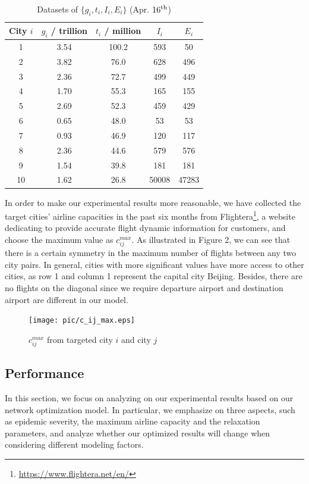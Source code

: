 \documentclass[11pt,twocolumn]{article}
\begin{document}
\begin{spacing}{2}
\begin{table}[H]
    \centering
    \caption{Datasets of $\{g_i, t_i, I_i, E_i\}$ (Apr. $16^{\rm th}$)}
    \setlength{\tabcolsep}{5pt}
    \begin{tabular}{c|c|c|c|c}
        \toprule
         City $i$ & $g_i$ / trillion & $t_i$ / million & $I_i$ & $E_i$ \\
         \toprule
         1 & 3.54 & 100.2 & 593  & 50 \\
         2 & 3.82 & 76.0 & 628 & 496 \\
         3 & 2.36 & 72.7 & 499 & 449 \\
         4 & 1.70 & 55.3 & 165 & 155 \\
         5 & 2.69 & 52.3 & 459 & 429 \\
         6 & 0.65 & 48.0 & 53 & 53 \\
         7 & 0.93 & 46.9 & 120 & 117 \\
         8 & 2.36 & 44.6 & 579 & 576 \\
         9 & 1.54 & 39.8 & 181 & 181 \\
         10 & 1.62 & 26.8 & 50008 & 47283 \\
        \bottomrule
    \end{tabular}
    \label{table2}
\end{table}
\end{spacing}
In order to make our experimental results more reasonable, we have collected
the target cities' airline capacities in the past six months from Flightera\footnote{\url{https://www.flightera.net/en/}}, a website dedicating to provide accurate flight dynamic information for customers, and choose the maximum value as $c_{ij}^{max}$. As illustrated in Figure 2, we can see that there is a certain symmetry in the maximum number of flights between any two city pairs. In general, cities with more significant values have more access to other cities, as row 1 and column 1 represent the capital city Beijing. Besides, there are no flights on the diagonal since we require departure airport and destination airport are different in our model.


\begin{figure}[H]
    \centering
    \texttt{[image: pic/c\_ij\_max.eps]}
    \caption{$c_{ij}^{max}$ from targeted city $i$ and city $j$}
    \label{fig:my_label}
\end{figure}


\subsection{Performance}
In this section, we focus on analyzing on our experimental results based on our network optimization model. In particular, we emphasize on three aspects, such as epidemic severity, the maximum airline capacity and the relaxation parameters, and analyze whether our optimized results will change when considering different modeling factors. 
\end{document}
